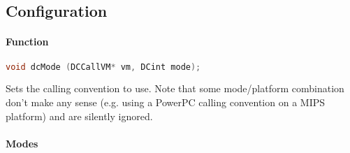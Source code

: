 \pagebreak

\subsection{Configuration}

\paragraph{Function}

\begin{lstlisting}[language=c]
void dcMode (DCCallVM* vm, DCint mode);
\end{lstlisting}

Sets the calling convention to use. Note that some mode/platform combination
don't make any sense (e.g. using a PowerPC calling convention on a MIPS
platform) and are silently ignored.

\paragraph{Modes}


